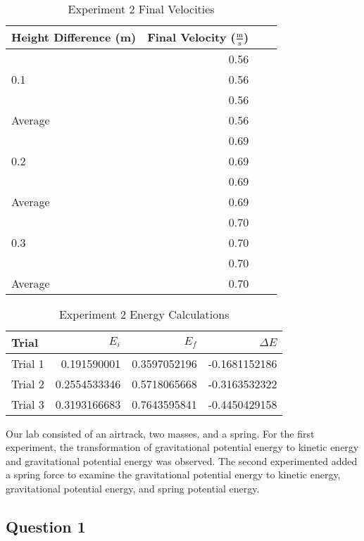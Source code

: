 \documentclass [12pt, letterpaper, twoside] {article}
\begin{document}
\begin {table}[h]
  \centering
  \begin {tabular} {| l | r | r | r |}
    \hline\hline
    Height Difference (m) & Final Velocity (\(\tfrac{\text{m}}{\text{s}}\)) \\
    \hline
    \multirow {3}{*}{0.1} & 0.56 \\
    & 0.56 \\
    & 0.56 \\
    \hline
    Average & 0.56 \\
    \hline
    \multirow {3}{*}{0.2} & 0.69 \\
    & 0.69 \\
    & 0.69 \\
    \hline
    Average & 0.69 \\
    \hline
    \multirow {3}{*}{0.3} & 0.70 \\
    & 0.70 \\
    & 0.70 \\
    \hline
    Average & 0.70 \\
    \hline\hline
  \end {tabular}
  \caption {Experiment 2 Final Velocities}
\end {table}

\begin {table}[h]
  \centering
  \begin {tabular} {| l | r | r | r |}
    \hline\hline
    Trial & \(E_{i}\) & \(E_{f}\) & \(\Delta{E}\) \\
    \hline
    Trial 1 & 0.191590001 & 0.3597052196 & -0.1681152186 \\
    \hline
    Trial 2 & 0.2554533346 & 0.5718065668 & -0.3163532322 \\
    \hline
    Trial 3 & 0.3193166683 & 0.7643595841 & -0.4450429158 \\ 
    \hline\hline
  \end {tabular}
  \caption {Experiment 2 Energy Calculations}
\end {table}

\noindent
Our lab consisted of an airtrack, two masses, and a spring. For the first experiment, the transformation of gravitational potential energy to kinetic energy and gravitational potential energy was observed. The second experimented added a spring force to examine the gravitational potential energy to kinetic energy, gravitational potential energy, and spring potential energy.

\subsection* {Question 1}
\end{document}
